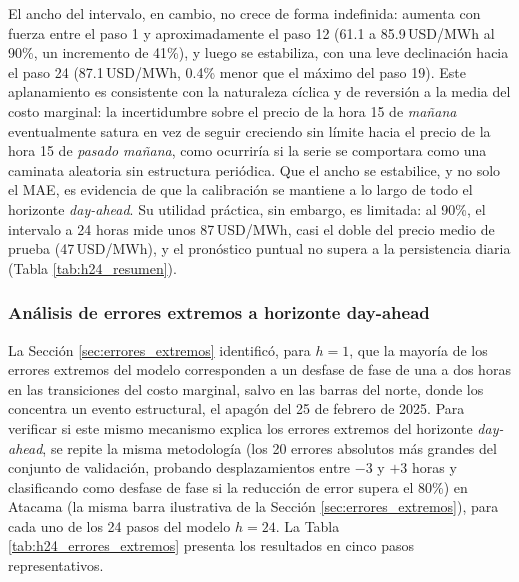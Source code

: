 El ancho del intervalo, en cambio, no crece de forma indefinida: aumenta con fuerza entre el paso 1 y aproximadamente el paso 12 (61.1 a 85.9\,USD/MWh al 90\%, un incremento de 41\%), y luego se estabiliza, con una leve declinación hacia el paso 24 (87.1\,USD/MWh, 0.4\% menor que el máximo del paso 19). Este aplanamiento es consistente con la naturaleza cíclica y de reversión a la media del costo marginal: la incertidumbre sobre el precio de la hora 15 de \textit{mañana} eventualmente satura en vez de seguir creciendo sin límite hacia el precio de la hora 15 de \textit{pasado mañana}, como ocurriría si la serie se comportara como una caminata aleatoria sin estructura periódica. Que el ancho se estabilice, y no solo el MAE, es evidencia de que la calibración se mantiene a lo largo de todo el horizonte \textit{day-ahead}. Su utilidad práctica, sin embargo, es limitada: al 90\%, el intervalo a 24 horas mide unos 87\,USD/MWh, casi el doble del precio medio de prueba (47\,USD/MWh), y el pronóstico puntual no supera a la persistencia diaria (Tabla \ref{tab:h24_resumen}).

\subsubsection{Análisis de errores extremos a horizonte day-ahead}
\label{sec:h24_errores_extremos}

La Sección \ref{sec:errores_extremos} identificó, para $h=1$, que la mayoría de los errores extremos del modelo corresponden a un desfase de fase de una a dos horas en las transiciones del costo marginal, salvo en las barras del norte, donde los concentra un evento estructural, el apagón del 25 de febrero de 2025. Para verificar si este mismo mecanismo explica los errores extremos del horizonte \textit{day-ahead}, se repite la misma metodología (los 20 errores absolutos más grandes del conjunto de validación, probando desplazamientos entre $-3$ y $+3$ horas y clasificando como desfase de fase si la reducción de error supera el 80\%) en Atacama (la misma barra ilustrativa de la Sección \ref{sec:errores_extremos}), para cada uno de los 24 pasos del modelo $h=24$. La Tabla \ref{tab:h24_errores_extremos} presenta los resultados en cinco pasos representativos.


